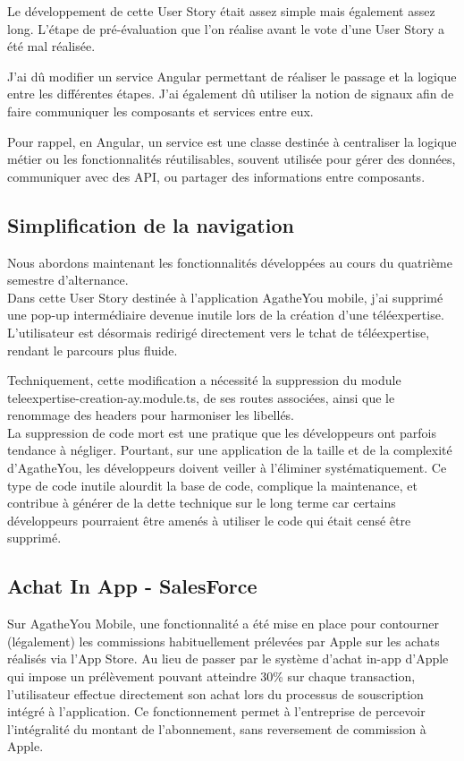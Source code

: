 \documentclass{article}
\begin{document}
Le développement de cette User Story était assez simple mais également assez long. L'étape de pré-évaluation que l'on réalise avant le vote d'une User Story a été mal réalisée.

J'ai dû modifier un service Angular permettant de réaliser le passage et la logique entre les différentes étapes. J'ai également dû utiliser la notion de signaux afin de faire communiquer les composants et services entre eux.

Pour rappel, en Angular, un service est une classe destinée à centraliser la logique métier ou les fonctionnalités réutilisables, souvent utilisée pour gérer des données, communiquer avec des API, ou partager des informations entre composants.

\subsection{Simplification de la navigation}

Nous abordons maintenant les fonctionnalités développées au cours du quatrième semestre d'alternance. \\

Dans cette User Story destinée à l'application AgatheYou mobile, j'ai supprimé une pop-up intermédiaire devenue inutile lors de la création d'une téléexpertise. L'utilisateur est désormais redirigé directement vers le tchat de téléexpertise, rendant le parcours plus fluide.

Techniquement, cette modification a nécessité la suppression du module teleexpertise-creation-ay.module.ts, de ses routes associées, ainsi que le renommage des headers pour harmoniser les libellés. \\

La suppression de code mort est une pratique que les développeurs ont parfois tendance à négliger. Pourtant, sur une application de la taille et de la complexité d'AgatheYou, les développeurs doivent veiller à l'éliminer systématiquement. Ce type de code inutile alourdit la base de code, complique la maintenance, et contribue à générer de la dette technique sur le long terme car certains développeurs pourraient être amenés à utiliser le code qui était censé être supprimé.

\subsection{Achat In App - SalesForce}

Sur AgatheYou Mobile, une fonctionnalité a été mise en place pour contourner (légalement) les commissions habituellement prélevées par Apple sur les achats réalisés via l'App Store. Au lieu de passer par le système d'achat in-app d'Apple qui impose un prélèvement pouvant atteindre 30\% sur chaque transaction, l'utilisateur effectue directement son achat lors du processus de souscription intégré à l'application. Ce fonctionnement permet à l'entreprise de percevoir l'intégralité du montant de l'abonnement, sans reversement de commission à Apple. \\
\end{document}
